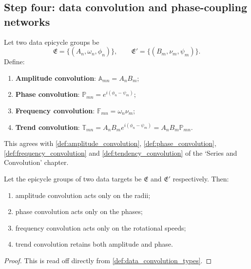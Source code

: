 \subsection{Step four: data convolution and phase-coupling networks}

\begin{definition}\label{def:data_convolution_types}
Let two data epicycle groups be
\[
\mathfrak E=\{(A_n,\omega_n,\phi_n)\},\qquad
\mathfrak E'=\{(B_m,\nu_m,\psi_m)\}.
\]
Define:
\begin{enumerate}[label=(\roman*)]
    \item \textbf{Amplitude convolution}: $\mathbb A_{mn}=A_nB_m$;
    \item \textbf{Phase convolution}: $\mathbb P_{mn}=e^{i(\phi_n-\psi_m)}$;
    \item \textbf{Frequency convolution}: $\mathbb F_{mn}=\omega_n\nu_m$;
    \item \textbf{Trend convolution}: $\mathbb T_{mn}=A_nB_m e^{i(\phi_n-\psi_m)}=A_nB_m\mathbb P_{mn}$.
\end{enumerate}
This agrees with \cref{def:amplitude_convolution}, \cref{def:phase_convolution}, \cref{def:frequency_convolution} and \cref{def:tendency_convolution} of the `Series and Convolution' chapter.
\end{definition}

\begin{theorem}\label{thm:data_convolution_action}
Let the epicycle groups of two data targets be $\mathfrak E$ and $\mathfrak E'$ respectively. Then:
\begin{enumerate}[label=(\roman*)]
    \item amplitude convolution acts only on the radii;
    \item phase convolution acts only on the phases;
    \item frequency convolution acts only on the rotational speeds;
    \item trend convolution retains both amplitude and phase.
\end{enumerate}
\end{theorem}

\begin{proof}
This is read off directly from \cref{def:data_convolution_types}.
\end{proof}

